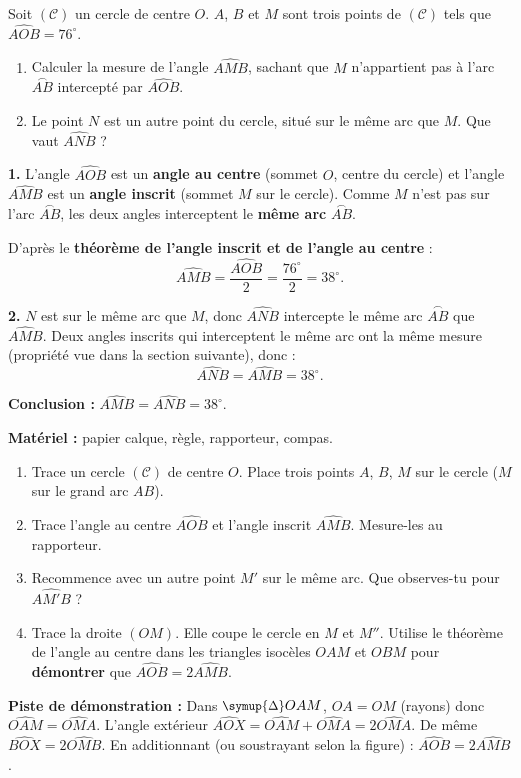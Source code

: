 \documentclass[11pt]{article}
\def\triangle{\mathord{\scalebox{0.9}{$\symup{\Delta}$}}}%
\begin{document}
\begin{exoresolu}
Soit $(\mathcal{C})$ un cercle de centre $O$. $A$, $B$ et $M$ sont trois points de $(\mathcal{C})$ tels que $\widehat{AOB} = 76^\circ$.
\begin{enumerate}
\item Calculer la mesure de l'angle $\widehat{AMB}$, sachant que $M$ n'appartient pas à l'arc $\overset{\frown}{AB}$ intercepté par $\widehat{AOB}$.
\item Le point $N$ est un autre point du cercle, situé sur le même arc que $M$. Que vaut $\widehat{ANB}$ ?
\end{enumerate}
\tcblower
\textbf{1.} L'angle $\widehat{AOB}$ est un \textbf{angle au centre} (sommet $O$, centre du cercle) et l'angle $\widehat{AMB}$ est un \textbf{angle inscrit} (sommet $M$ sur le cercle). Comme $M$ n'est pas sur l'arc $\overset{\frown}{AB}$, les deux angles interceptent le \textbf{même arc} $\overset{\frown}{AB}$.

D'après le \textbf{théorème de l'angle inscrit et de l'angle au centre} :
\[ \widehat{AMB} = \frac{\widehat{AOB}}{2} = \frac{76^\circ}{2} = 38^\circ. \]

\textbf{2.} $N$ est sur le même arc que $M$, donc $\widehat{ANB}$ intercepte le même arc $\overset{\frown}{AB}$ que $\widehat{AMB}$. Deux angles inscrits qui interceptent le même arc ont la même mesure (propriété vue dans la section suivante), donc :
\[ \widehat{ANB} = \widehat{AMB} = 38^\circ. \]

\textbf{Conclusion :} $\widehat{AMB} = \widehat{ANB} = 38^\circ$.
\end{exoresolu}

\begin{experience}
\textbf{Matériel :} papier calque, règle, rapporteur, compas.
\begin{enumerate}
\item Trace un cercle $(\mathcal{C})$ de centre $O$. Place trois points $A$, $B$, $M$ sur le cercle ($M$ sur le grand arc $AB$).
\item Trace l'angle au centre $\widehat{AOB}$ et l'angle inscrit $\widehat{AMB}$. Mesure-les au rapporteur.
\item Recommence avec un autre point $M'$ sur le même arc. Que observes-tu pour $\widehat{AM'B}$ ?
\item Trace la droite $(OM)$. Elle coupe le cercle en $M$ et $M''$. Utilise le théorème de l'angle au centre dans les triangles isocèles $OAM$ et $OBM$ pour \textbf{démontrer} que $\widehat{AOB} = 2\widehat{AMB}$.
\end{enumerate}
\textbf{Piste de démonstration :} Dans $\triangle OAM$, $OA=OM$ (rayons) donc $\widehat{OAM}=\widehat{OMA}$. L'angle extérieur $\widehat{AOX} = \widehat{OAM}+\widehat{OMA} = 2\widehat{OMA}$. De même $\widehat{BOX}=2\widehat{OMB}$. En additionnant (ou soustrayant selon la figure) : $\widehat{AOB}=2\widehat{AMB}$.
\end{experience}
\end{document}
